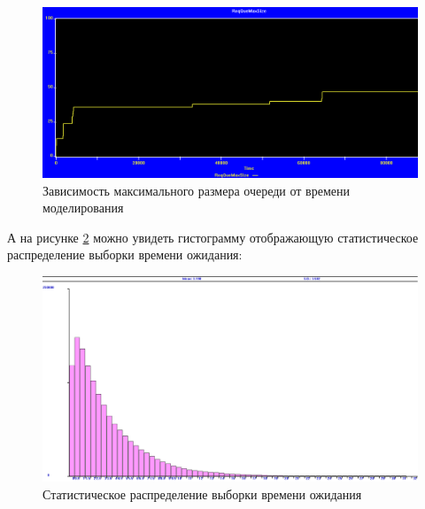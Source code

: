 \begin{figure}[!h]
	\includegraphics[width=1\linewidth]{inc/img/1.png}
	\caption{Зависимость максимального размера очереди от времени моделирования}
	\label{p1}
\end{figure}

А на рисунке \ref{p8} можно увидеть гистограмму отображающую статистическое распределение выборки времени ожидания: 

\begin{figure}[!h]
	\includegraphics[width=1\linewidth]{inc/img/8.png}
	\caption{Статистическое распределение выборки времени ожидания}
	\label{p8}
\end{figure}
